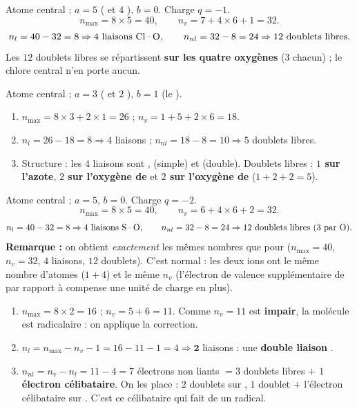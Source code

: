 \documentclass[11pt,a4paper]{article}
\begin{document}
\begin{corrige}
Atome central  ; $a=5$ ( et $4$ ), $b=0$. Charge $q=-1$.
\[ n_{\max} = 8\times 5 = 40,\qquad n_v = 7 + 4\times 6 + 1 = 32. \]
\[ n_l = 40 - 32 = 8 \Rightarrow 4\ \text{liaisons \ce{Cl-O}},\qquad
   n_{nl} = 32 - 8 = 24 \Rightarrow 12\ \text{doublets libres}. \]
Les $12$ doublets libres se répartissent \textbf{sur les quatre oxygènes} ($3$ chacun) ; le
chlore central n'en porte aucun.
\end{corrige}

\begin{corrige}
Atome central  ; $a=3$ ( et $2$ ), $b=1$ (le ).
\begin{enumerate}[label=\alph*)]
  \item $n_{\max} = 8\times 3 + 2\times 1 = 26$ ; \; $n_v = 1 + 5 + 2\times 6 = 18$.
  \item $n_l = 26 - 18 = 8 \Rightarrow 4$ liaisons ; \; $n_{nl} = 18 - 8 = 10 \Rightarrow 5$
        doublets libres.
  \item Structure  : les $4$ liaisons sont ,  (simple) et 
        (double). Doublets libres : \textbf{$1$ sur l'azote}, \textbf{$2$ sur l'oxygène de
        } et \textbf{$2$ sur l'oxygène de } ($1+2+2 = 5$). \checkmark
\end{enumerate}
\end{corrige}

\begin{corrige}
Atome central  ; $a=5$, $b=0$. Charge $q=-2$.
\[ n_{\max} = 8\times 5 = 40,\qquad n_v = 6 + 4\times 6 + 2 = 32. \]
\[ n_l = 40 - 32 = 8 \Rightarrow 4\ \text{liaisons \ce{S-O}},\qquad
   n_{nl} = 32 - 8 = 24 \Rightarrow 12\ \text{doublets libres} \ (3\ \text{par \ce{O}}). \]
\textbf{Remarque :} on obtient \emph{exactement} les mêmes nombres que pour 
($n_{\max}=40$, $n_v=32$, $4$ liaisons, $12$ doublets). C'est normal : les deux ions ont le même
nombre d'atomes ($1+4$) et le même $n_v$ (l'électron de valence supplémentaire de  par
rapport à  compense une unité de charge en plus).
\end{corrige}

\begin{corrige}
\begin{enumerate}[label=\alph*)]
  \item $n_{\max} = 8\times 2 = 16$ ; \; $n_v = 5 + 6 = 11$. Comme $n_v = 11$ est \textbf{impair},
        la molécule est radicalaire : on applique la correction.
  \item $n_l = n_{\max} - n_v - 1 = 16 - 11 - 1 = 4 \Rightarrow \mathbf{2}$ liaisons : une
        \textbf{double liaison} .
  \item $n_{nl} = n_v - n_l = 11 - 4 = 7$ électrons non liants $= 3$ doublets libres
        \textbf{$+$ $1$ électron célibataire}. On les place : $2$ doublets sur , $1$ doublet
        $+$ l'électron célibataire sur . C'est ce célibataire qui fait de  un radical.
\end{enumerate}
\end{corrige}
\end{document}
